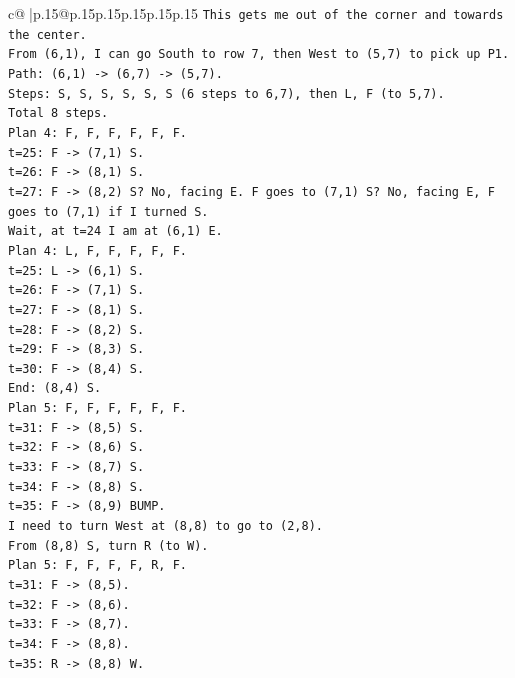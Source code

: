 \documentclass{article}
\begin{document}
{\begin{supertabular}{c@{$\;$}|p{.15\linewidth}@{}p{.15\linewidth}p{.15\linewidth}p{.15\linewidth}p{.15\linewidth}p{.15\linewidth}}
{{{\texttt{This gets me out of the corner and towards the center.} \\
\texttt{From (6,1), I can go South to row 7, then West to (5,7) to pick up P1.} \\
\texttt{Path: (6,1) {-}> (6,7) {-}> (5,7).} \\
\texttt{Steps: S, S, S, S, S, S (6 steps to 6,7), then L, F (to 5,7).} \\
\texttt{Total 8 steps.} \\
\texttt{Plan 4: F, F, F, F, F, F.} \\
\texttt{t=25: F {-}> (7,1) S.} \\
\texttt{t=26: F {-}> (8,1) S.} \\
\texttt{t=27: F {-}> (8,2) S? No, facing E. F goes to (7,1) S? No, facing E, F goes to (7,1) if I turned S.} \\
\texttt{Wait, at t=24 I am at (6,1) E.} \\
\texttt{Plan 4: L, F, F, F, F, F.} \\
\texttt{t=25: L {-}> (6,1) S.} \\
\texttt{t=26: F {-}> (7,1) S.} \\
\texttt{t=27: F {-}> (8,1) S.} \\
\texttt{t=28: F {-}> (8,2) S.} \\
\texttt{t=29: F {-}> (8,3) S.} \\
\texttt{t=30: F {-}> (8,4) S.} \\
\texttt{End: (8,4) S.} \\
\texttt{Plan 5: F, F, F, F, F, F.} \\
\texttt{t=31: F {-}> (8,5) S.} \\
\texttt{t=32: F {-}> (8,6) S.} \\
\texttt{t=33: F {-}> (8,7) S.} \\
\texttt{t=34: F {-}> (8,8) S.} \\
\texttt{t=35: F {-}> (8,9) BUMP.} \\
\texttt{I need to turn West at (8,8) to go to (2,8).} \\
\texttt{From (8,8) S, turn R (to W).} \\
\texttt{Plan 5: F, F, F, F, R, F.} \\
\texttt{t=31: F {-}> (8,5).} \\
\texttt{t=32: F {-}> (8,6).} \\
\texttt{t=33: F {-}> (8,7).} \\
\texttt{t=34: F {-}> (8,8).} \\
\texttt{t=35: R {-}> (8,8) W.} \\
}}}
\end{supertabular}}
\end{document}
